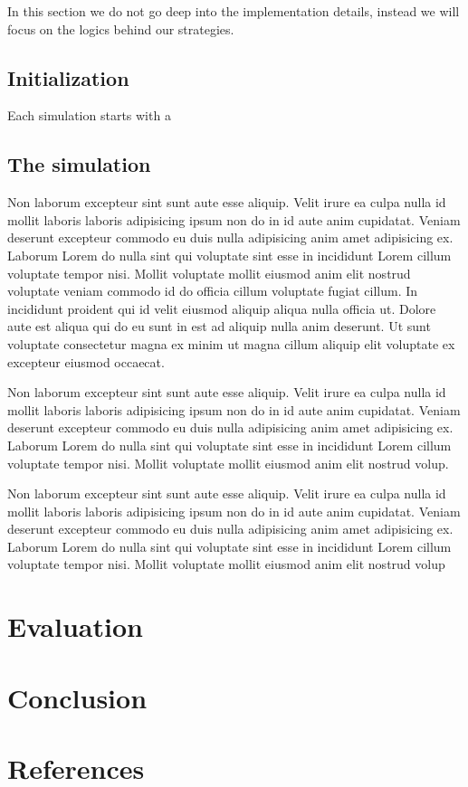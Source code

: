 \documentclass[12pt]{article}
\begin{document}
In this section we do not go deep into the implementation details, instead we will focus on the logics behind our strategies.

\subsection{Initialization}

Each simulation starts with a

\subsection{The simulation}



Non laborum excepteur sint sunt aute esse aliquip. Velit irure ea culpa nulla id mollit laboris laboris adipisicing ipsum non do in id aute anim cupidatat. Veniam deserunt excepteur commodo eu duis nulla adipisicing anim amet adipisicing ex. Laborum Lorem do nulla sint qui voluptate sint esse in incididunt Lorem cillum voluptate tempor nisi. Mollit voluptate mollit eiusmod anim elit nostrud voluptate veniam commodo id do officia cillum voluptate fugiat cillum. In incididunt proident qui id velit eiusmod aliquip aliqua nulla officia ut. Dolore aute est aliqua qui do eu sunt in est ad aliquip nulla anim deserunt. Ut sunt voluptate consectetur magna ex minim ut magna cillum aliquip elit voluptate ex excepteur eiusmod occaecat.



Non laborum excepteur sint sunt aute esse aliquip. Velit irure ea culpa nulla id mollit laboris laboris adipisicing ipsum non do in id aute anim cupidatat. Veniam deserunt excepteur commodo eu duis nulla adipisicing anim amet adipisicing ex. Laborum Lorem do nulla sint qui voluptate sint esse in incididunt Lorem cillum voluptate tempor nisi. Mollit voluptate mollit eiusmod anim elit nostrud volup.



Non laborum excepteur sint sunt aute esse aliquip. Velit irure ea culpa nulla id mollit laboris laboris adipisicing ipsum non do in id aute anim cupidatat. Veniam deserunt excepteur commodo eu duis nulla adipisicing anim amet adipisicing ex. Laborum Lorem do nulla sint qui voluptate sint esse in incididunt Lorem cillum voluptate tempor nisi. Mollit voluptate mollit eiusmod anim elit nostrud volup

\section{Evaluation}

\section{Conclusion}

\section{References}
\end{document}
